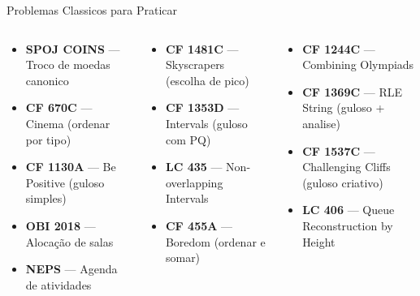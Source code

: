 \documentclass[aspectratio=169,10pt]{beamer}
\begin{document}
\begin{frame}{Problemas Classicos para Praticar}
  \begin{columns}[t]
      \begin{tcolorbox}[caixaVerde,title={Iniciante}]
        \begin{itemize}\footnotesize
          \item \textbf{SPOJ COINS} --- Troco de moedas canonico
          \item \textbf{CF 670C} --- Cinema (ordenar por tipo)
          \item \textbf{CF 1130A} --- Be Positive (guloso simples)
          \item \textbf{OBI 2018} --- Alocação de salas
          \item \textbf{NEPS} --- Agenda de atividades
        \end{itemize}
      \end{tcolorbox}
      \vspace{0.1cm}
      \begin{tcolorbox}[caixaAzul,title={Intermediario}]
        \begin{itemize}\footnotesize
          \item \textbf{CF 1481C} --- Skyscrapers (escolha de pico)
          \item \textbf{CF 1353D} --- Intervals (guloso com PQ)
          \item \textbf{LC 435} --- Non-overlapping Intervals
          \item \textbf{CF 455A} --- Boredom (ordenar e somar)
        \end{itemize}
      \end{tcolorbox}
      \begin{tcolorbox}[caixaRoxa,title={Avancado}]
        \begin{itemize}\footnotesize
          \item \textbf{CF 1244C} --- Combining Olympiads
          \item \textbf{CF 1369C} --- RLE String (guloso + analise)
          \item \textbf{CF 1537C} --- Challenging Cliffs (guloso criativo)
          \item \textbf{LC 406} --- Queue Reconstruction by Height
        \end{itemize}
      \end{tcolorbox}
      \vspace{0.1cm}

\end{columns}
\end{frame}
\end{document}
